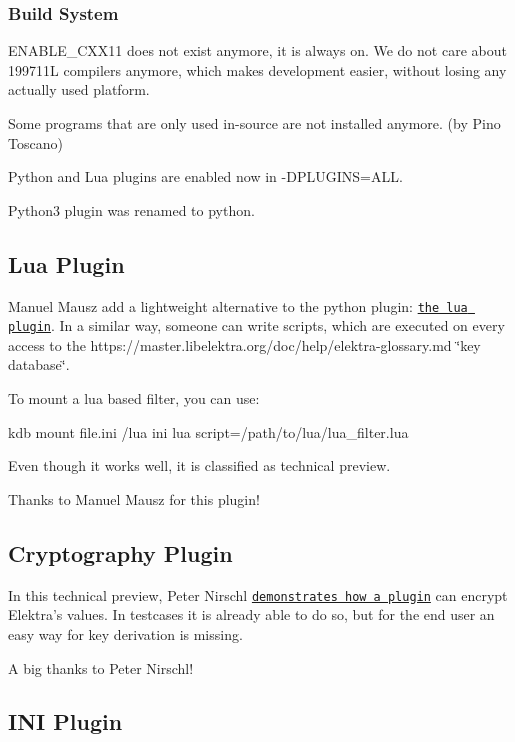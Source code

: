 \subsubsection*{Build System}

E\+N\+A\+B\+L\+E\+\_\+\+C\+X\+X11 does not exist anymore, it is always on. We do not care about 199711L compilers anymore, which makes development easier, without losing any actually used platform.

Some programs that are only used in-\/source are not installed anymore. (by Pino Toscano)

Python and Lua plugins are enabled now in {\ttfamily -\/\+D\+P\+L\+U\+G\+I\+NS=A\+LL}.

Python3 plugin was renamed to python.

\subsection*{Lua Plugin}

Manuel Mausz add a lightweight alternative to the python plugin\+: \href{https://master.libelektra.org/src/plugins/lua/}{\tt the lua plugin}. In a similar way, someone can write scripts, which are executed on every access to the https\+://master.libelektra.\+org/doc/help/elektra-\/glossary.md \char`\"{}key database\char`\"{}.

To mount a lua based filter, you can use\+: \begin{DoxyVerb}kdb mount file.ini /lua ini lua script=/path/to/lua/lua_filter.lua
\end{DoxyVerb}


Even though it works well, it is classified as technical preview.

Thanks to Manuel Mausz for this plugin!

\subsection*{Cryptography Plugin}

In this technical preview, Peter Nirschl \href{https://master.libelektra.org/src/plugins/crypto/}{\tt demonstrates how a plugin} can encrypt Elektra’s values. In testcases it is already able to do so, but for the end user an easy way for key derivation is missing.

A big thanks to Peter Nirschl!

\subsection*{I\+NI Plugin}

